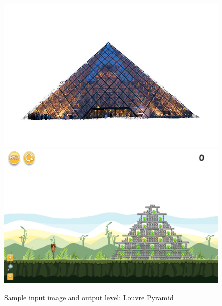 \documentclass{dalthesis}
\begin{document}
\begin{figure}
	\caption{Sample input image and output level: Louvre Pyramid}
  \includegraphics[width=\textwidth,height=\textheight,keepaspectratio]{levels/pictures/buildings/louvre_pyramid.jpg}
  \includegraphics[width=\textwidth,height=\textheight,keepaspectratio]{levels/screenshots/buildings/louvre_pyramid.png}
\end{figure}
\end{document}
